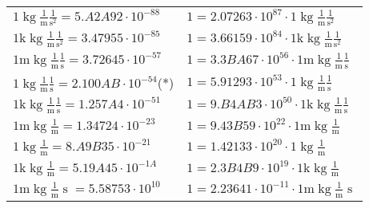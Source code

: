 \begin{center}
\begin{longtable}{l l}
{\color{black}$1 \bm{\mathrm{ }}\operatorname{kg}\frac1{\operatorname{m}}\frac1{\operatorname{s}^2}{}{} = 5.A2A92\cdot10^{-88} $}   & {\color{black}$ 1 = 2.07263\cdot10^{87} \cdot 1 \bm{\mathrm{ }}\operatorname{kg}\frac1{\operatorname{m}}\frac1{\operatorname{s}^2}{}{}$}  \\
{\color{gray}$1 \bm{\mathrm{ k}}\operatorname{kg}\frac1{\operatorname{m}}\frac1{\operatorname{s}^2}{}{} = 3.47955\cdot10^{-85} $}   & {\color{gray}$ 1 = 3.66159\cdot10^{84} \cdot 1 \bm{\mathrm{ k}}\operatorname{kg}\frac1{\operatorname{m}}\frac1{\operatorname{s}^2}{}{}$}  \\
{\color{gray}$1 \bm{\mathrm{ m}}\operatorname{kg}\frac1{\operatorname{m}}\frac1{\operatorname{s}}{}{} = 3.72645\cdot10^{-57} $}   & {\color{gray}$ 1 = 3.3BA67\cdot10^{56} \cdot 1 \bm{\mathrm{ m}}\operatorname{kg}\frac1{\operatorname{m}}\frac1{\operatorname{s}}{}{}$}  \\
{\color{black}$1 \bm{\mathrm{ }}\operatorname{kg}\frac1{\operatorname{m}}\frac1{\operatorname{s}}{}{} = 2.100AB\cdot10^{-54} $}\quad(*) & {\color{black}$ 1 = 5.91293\cdot10^{53} \cdot 1 \bm{\mathrm{ }}\operatorname{kg}\frac1{\operatorname{m}}\frac1{\operatorname{s}}{}{}$}  \\
{\color{gray}$1 \bm{\mathrm{ k}}\operatorname{kg}\frac1{\operatorname{m}}\frac1{\operatorname{s}}{}{} = 1.257A4\cdot10^{-51} $}   & {\color{gray}$ 1 = 9.B4AB3\cdot10^{50} \cdot 1 \bm{\mathrm{ k}}\operatorname{kg}\frac1{\operatorname{m}}\frac1{\operatorname{s}}{}{}$}  \\
{\color{gray}$1 \bm{\mathrm{ m}}\operatorname{kg}\frac1{\operatorname{m}}{}{}{} = 1.34724\cdot10^{-23} $}   & {\color{gray}$ 1 = 9.43B59\cdot10^{22} \cdot 1 \bm{\mathrm{ m}}\operatorname{kg}\frac1{\operatorname{m}}{}{}{}$}  \\
{\color{black}$1 \bm{\mathrm{ }}\operatorname{kg}\frac1{\operatorname{m}}{}{}{} = 8.A9B35\cdot10^{-21} $}   & {\color{black}$ 1 = 1.42133\cdot10^{20} \cdot 1 \bm{\mathrm{ }}\operatorname{kg}\frac1{\operatorname{m}}{}{}{}$}  \\
{\color{gray}$1 \bm{\mathrm{ k}}\operatorname{kg}\frac1{\operatorname{m}}{}{}{} = 5.19A45\cdot10^{-1A} $}   & {\color{gray}$ 1 = 2.3B4B9\cdot10^{19} \cdot 1 \bm{\mathrm{ k}}\operatorname{kg}\frac1{\operatorname{m}}{}{}{}$}  \\
{\color{gray}$1 \bm{\mathrm{ m}}\operatorname{kg}\frac1{\operatorname{m}}{\operatorname{s}}{}{} = 5.58753\cdot10^{10} $}   & {\color{gray}$ 1 = 2.23641\cdot10^{-11} \cdot 1 \bm{\mathrm{ m}}\operatorname{kg}\frac1{\operatorname{m}}{\operatorname{s}}{}{}$}  \\

\end{longtable}
\end{center}
